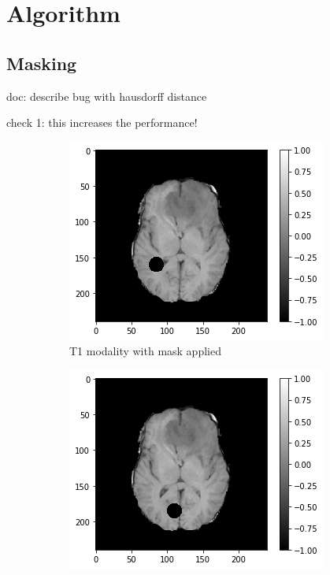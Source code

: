 \section{Algorithm}

\subsection{Masking}

doc: describe bug with hausdorff distance

check 1: this increases the performance!

\begin{figure}[H]
    \centering
    \begin{subfigure}{.33\textwidth}
        \centering
        \includegraphics[width=\linewidth]{chapters/06_hdm/images_masked/masked_0.png}
        \caption{T1 modality with mask applied}
    \end{subfigure}%
    \begin{subfigure}{.33\textwidth}
        \centering
        \includegraphics[width=\linewidth]{chapters/06_hdm/images_masked/masked_4.png}

\end{subfigure}
\end{figure}
